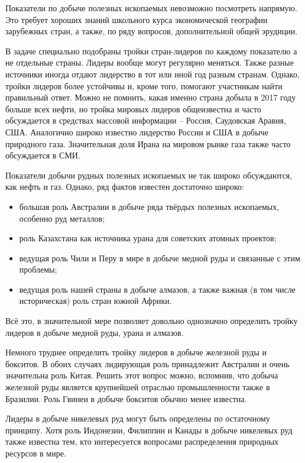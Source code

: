 Показатели по добыче полезных ископаемых невозможно посмотреть напрямую. Это требует хороших знаний школьного курса экономической географии зарубежных стран, а также, по ряду вопросов, дополнительной общей эрудиции.

В задаче специально подобраны тройки стран-лидеров по каждому показателю а не отдельные страны. Лидеры вообще могут регулярно меняться. Также разные источники иногда отдают лидерство в тот или иной год разным странам. Однако, тройки лидеров более устойчивы и, кроме того, помогают участникам найти правильный ответ. Можно не помнить, какая именно страна добыла в 2017 году больше всех нефти, но тройка мировых лидеров общеизвестна и часто обсуждается в средствах массовой информации – Россия, Саудовская Аравия, США. Аналогично широко известно лидерство России и США в добыче природного газа. Значительная доля Ирана на мировом рынке газа также часто обсуждается в СМИ.

Показатели добычи рудных полезных ископаемых не так широко обсуждаются, как нефть и газ. Однако, ряд фактов известен достаточно широко:
\begin{itemize}
    \item большая роль Австралии в добыче ряда твёрдых полезных ископаемых, особенно руд металлов;
    \item роль Казахстана как источника урана для советских атомных проектов;
    \item ведущая роль Чили и Перу в мире в добыче медной руды и связанные с этим проблемы;
    \item ведущая роль нашей страны в добыче алмазов, а также важная (в том числе историческая) роль стран южной Африки.
\end{itemize}

Всё это, в значительной мере позволяет довольно однозначно определить тройку лидеров в добыче медной руды, урана и алмазов.

Немного труднее определить тройку лидеров в добыче железной руды и бокситов. В обоих случаях лидирующая роль принадлежит Австралии и очень значительна роль Китая. Решить этот вопрос можно, вспомнив, что добыча железной руды является крупнейшей отраслью промышленности также в Бразилии. Роль Гвинеи в добыче бокситов обычно менее известна.

Лидеры в добыче никелевых руд могут быть определены по остаточному принципу. Хотя роль Индонезии, Филиппин и Канады в добыче никелевых руд также известна тем, кто интересуется вопросами распределения природных ресурсов в мире.

